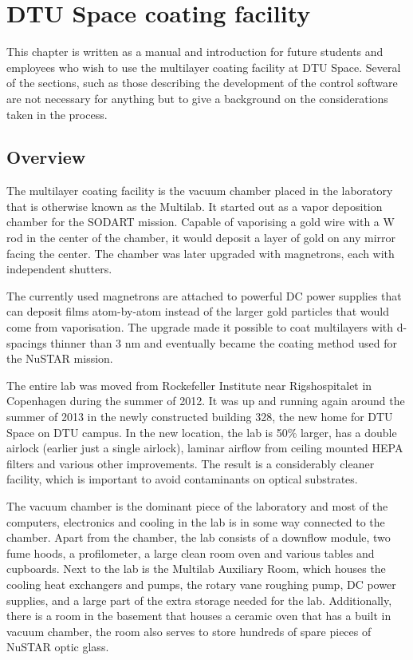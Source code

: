 \chapter{DTU Space coating facility}
This chapter is written as a manual and introduction for future students and employees who wish to use the multilayer coating facility at DTU Space. Several of the sections, such as those describing the development of the control software are not necessary for anything but to give a background on the considerations taken in the process.

\section{Overview}
The multilayer coating facility is the vacuum chamber placed in the laboratory that is otherwise known as the Multilab. It started out as a vapor deposition chamber for the SODART mission. Capable of vaporising a gold wire with a W rod in the center of the chamber, it would deposit a layer of gold on any mirror facing the center. The chamber was later upgraded with magnetrons, each with independent shutters.

The currently used magnetrons are attached to powerful DC power supplies that can deposit films atom-by-atom instead of the larger gold particles that would come from vaporisation. The upgrade made it possible to coat multilayers with d-spacings thinner than 3 nm and eventually became the coating method used for the NuSTAR mission.

The entire lab was moved from Rockefeller Institute near Rigshospitalet in Copenhagen during the summer of 2012. It was up and running again around the summer of 2013 in the newly constructed building 328, the new home for DTU Space on DTU campus. In the new location, the lab is 50\% larger, has a double airlock (earlier just a single airlock), laminar airflow from ceiling mounted HEPA filters and various other improvements. The result is a considerably cleaner facility, which is important to avoid contaminants on optical substrates.

The vacuum chamber is the dominant piece of the laboratory and most of the computers, electronics and cooling in the lab is in some way connected to the chamber. Apart from the chamber, the lab consists of a downflow module, two fume hoods, a profilometer, a large clean room oven and various tables and cupboards. Next to the lab is the Multilab Auxiliary Room, which houses the cooling heat exchangers and pumps, the rotary vane roughing pump, DC power supplies, and a large part of the extra storage needed for the lab. Additionally, there is a room in the basement that houses a ceramic oven that has a built in vacuum chamber, the room also serves to store hundreds of spare pieces of NuSTAR optic glass.

